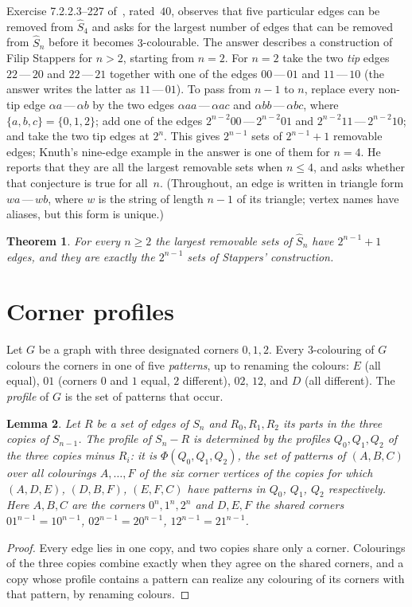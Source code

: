 \documentclass[11pt]{amsart}
\newtheorem{theorem}{Theorem}
\newtheorem{lemma}[theorem]{Lemma}
\theoremstyle{remark}
\newcommand{\Sh}{\widehat S}
\begin{document}
Exercise 7.2.2.3--227 of~\cite{knuth7}, rated~$40$, observes that five particular edges can be removed from
$\Sh_4$ and asks for the largest number of edges that can be removed from $\Sh_n$ before it becomes
$3$-colourable. The answer describes a construction of Filip Stappers for $n>2$, starting from $n=2$. For $n=2$
take the two \emph{tip} edges $22\,\text{---}\,20$ and $22\,\text{---}\,21$ together with one of the edges
$00\,\text{---}\,01$ and $11\,\text{---}\,10$ (the answer writes the latter as $11\,\text{---}\,01$). To pass from $n-1$ to $n$, replace every non-tip edge $\alpha a\,\text{---}\,\alpha b$ by the two edges
$\alpha aa\,\text{---}\,\alpha ac$ and $\alpha bb\,\text{---}\,\alpha bc$, where $\{a,b,c\}=\{0,1,2\}$; add one of
the edges $2^{n-2}00\,\text{---}\,2^{n-2}01$ and $2^{n-2}11\,\text{---}\,2^{n-2}10$; and take the two tip edges
at $2^n$. This gives $2^{n-1}$ sets of $2^{n-1}+1$ removable edges; Knuth's nine-edge example in the answer is one of them
for $n=4$. He reports that they are all the largest removable sets when $n\le4$, and asks whether that conjecture
is true for all~$n$. (Throughout, an edge is written in triangle form $wa\,\text{---}\,wb$, where $w$ is the string
of length $n-1$ of its triangle; vertex names have aliases, but this form is unique.)

\begin{theorem}\label{thm:main}
For every $n\ge2$ the largest removable sets of $\Sh_n$ have $2^{n-1}+1$ edges, and they are exactly the
$2^{n-1}$ sets of Stappers' construction.
\end{theorem}

\section{Corner profiles}
Let $G$ be a graph with three designated corners $0,1,2$. Every $3$-colouring of $G$ colours the corners in one of
five \emph{patterns}, up to renaming the colours: $E$ (all equal), $01$ (corners $0$ and $1$ equal, $2$ different),
$02$, $12$, and $D$ (all different). The \emph{profile} of $G$ is the set of patterns that occur.

\begin{lemma}\label{lem:comp}
Let $R$ be a set of edges of $S_n$ and $R_0,R_1,R_2$ its parts in the three copies of $S_{n-1}$. The profile of
$S_n-R$ is determined by the profiles $Q_0,Q_1,Q_2$ of the three copies minus $R_i$: it is $\Phi(Q_0,Q_1,Q_2)$, the
set of patterns of $(A,B,C)$ over all colourings $A,\dots,F$ of the six corner vertices of the copies for which
$(A,D,E)$, $(D,B,F)$, $(E,F,C)$ have patterns in $Q_0$, $Q_1$, $Q_2$ respectively. Here $A,B,C$ are the corners
$0^n,1^n,2^n$ and $D,E,F$ the shared corners $01^{n-1}=10^{n-1}$, $02^{n-1}=20^{n-1}$, $12^{n-1}=21^{n-1}$.
\end{lemma}
\begin{proof}
Every edge lies in one copy, and two copies share only a corner. Colourings of the three copies combine exactly
when they agree on the shared corners, and a copy whose profile contains a pattern can realize any colouring of
its corners with that pattern, by renaming colours.
\end{proof}
\end{document}
